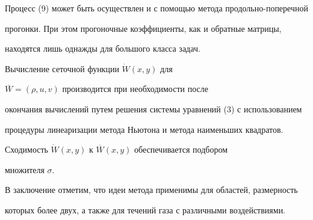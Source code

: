  


Процесс (9) может быть осуществлен и с помощью метода продольно-поперечной 


прогонки. При этом прогоночные коэффициенты, как и обратные матрицы, 


находятся лишь однажды для большого класса задач. 


 


Вычисление сеточной функции $\Dot W(x,y)$ для 


$\overline W=(\rho,u,v)$ производится при необходимости после 


окончания вычислений путем решения системы уравнений (3) с использованием 


процедуры линеаризации метода Ньютона и метода наименьших квадратов. 


Сходимость $\Dot W(x,y)$ к $\overline W(x,y)$ обеспечивается подбором 


множителя $\sigma$. 


 


В заключение отметим, что идеи метода применимы для областей, размерность 


которых более двух, а также для течений газа с различными воздействиями. 


 


